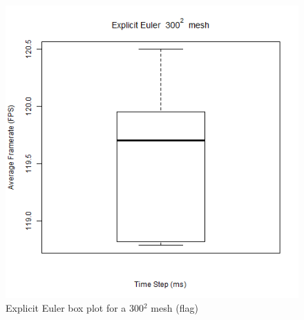       \begin{figure}
    \begin{center}
      \includegraphics[scale=.9]{Figures/flag_ee_300_box}
    \end{center}
    \caption{Explicit Euler box plot for a 300$^{2}$ mesh (flag)}
    \label{fig:ee box 300 flag}
  \end{figure}

